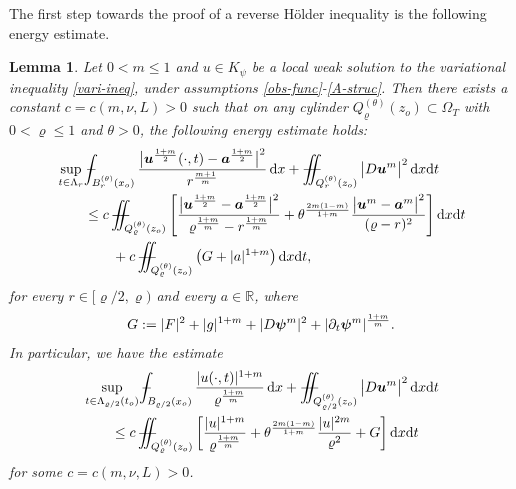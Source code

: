 \documentclass[a4paper, 10pt, american]{amsart}
\newtheorem{lemma}[theorem]{Lemma}
\numberwithin{theorem}{section}
\numberwithin{equation}{section}
\newcommand{\mint}{- \mskip-19,5mu \int}
\def\R{\mathbb{R}}
\newcommand{\dxdt}{\,\mathrm{d}x\mathrm{d}t}
\newcommand{\dx}{\,\mathrm{d}x}
\renewcommand{\rho}{\varrho}
\newcommand{\power}[2]{\bm{#1^{\mbox{\unboldmath{\scriptsize$#2$}}}}}
\def\Xiint#1{\mathchoice
    {\XXiint\displaystyle\textstyle{#1}}%
    {\XXiint\textstyle\scriptstyle{#1}}%
    {\XXiint\scriptstyle\scriptscriptstyle{#1}}%
    {\XXiint\scriptscriptstyle\scriptscriptstyle{#1}}%
    \!\iint}
\def\XXiint#1#2#3{\setbox0=\hbox{$#1{#2#3}{\iint}$}
    \vcenter{\hbox{$#2#3$}}\kern-0.5\wd0}
\def\biint{\Xiint{-\!-}}
\begin{document}
The first step towards the proof of a reverse H\"older inequality is
the following energy estimate. 

\begin{lemma}\label{lem:energy}
Let $0<m\le1$ and $u\in K_\psi$ be a local weak solution to the
variational inequality \eqref{vari-ineq}, under assumptions
\eqref{obs-func}-\eqref{A-struc}.
Then there exists a constant $c=c(m,\nu,L)>0$ such that
on any cylinder $Q_{\rho}^{(\theta)}(z_o)\subset\Omega_T$ with
$0<\rho\le 1$ and $\theta>0$,  the following energy estimate holds:
\begin{align}\label{energy:a}\nonumber
	& \sup_{t \in \Lambda_r } 
 \mint_{B_r^{(\theta)} (x_o)} 
	\frac{ \big|\power u {\frac{1+m}2}(\cdot,t)-\power a{\frac{1+m}2}\big|^2}{r^{\frac{m+1}{m}}} \dx 
	+
	\biint_{Q_r^{(\theta)}(z_o)} \big|D\power um\big|^2 \dxdt \\\nonumber
	&\qquad\leq 
	c\,\biint_{Q_\rho^{(\theta)}(z_o)} 
	\Bigg[ \frac{\big|\power u {\frac{1+m}2} - \power a {\frac{1+m}2}\big|^2}{\rho^{\frac{1+m}{m}}-r^{\frac{1+m}{m}}}
	+
	\theta^{\frac{2m(1-m)}{1+m}}\frac{\big|\power um-\power a {m}\big|^2}{(\rho-r)^2}\Bigg]
	  \dxdt \\
	  &\qquad\qquad+
	c\, \biint_{Q_{\rho}^{(\theta)}(z_o)}\big( G+|a|^{1+m}\big) \dxdt ,
\end{align}
for every $r\in[\rho/2,\rho)$ and every  $a \in\R$,
where
\begin{align*}
G:= |F|^{2}  +|g|^{1+m}+ |D\power \psi m|^2 + |\partial_t \power \psi m|^{\frac{1+m}m} .
\end{align*}
In particular, we have the estimate
\begin{align}\label{energy:a=0}
	& \sup_{t \in \Lambda_{\rho/2}(t_o) } 
 \mint_{B_{\rho/2} (x_o)} 
	\frac{ |u(\cdot,t)|^{1+m}}{\rho^{\frac{1+m}{m}}} \dx 
	+
	\biint_{Q_{\rho/2}^{(\theta)}(z_o)} \big|D\power um\big|^2 \dxdt \nonumber\\
	&\qquad\leq 
	c\,\biint_{Q_\rho^{(\theta)}(z_o)} 
	\bigg[ \frac{|u|^{1+m}}{\rho^{\frac{1+m}{m}}}
	+
	\theta^{\frac{2m(1-m)}{1+m}}\frac{|u|^{2m}}{\rho^2} + G\bigg] \dxdt 
\end{align}
for some $c=c(m,\nu,L)>0$.
\end{lemma}
\end{document}
